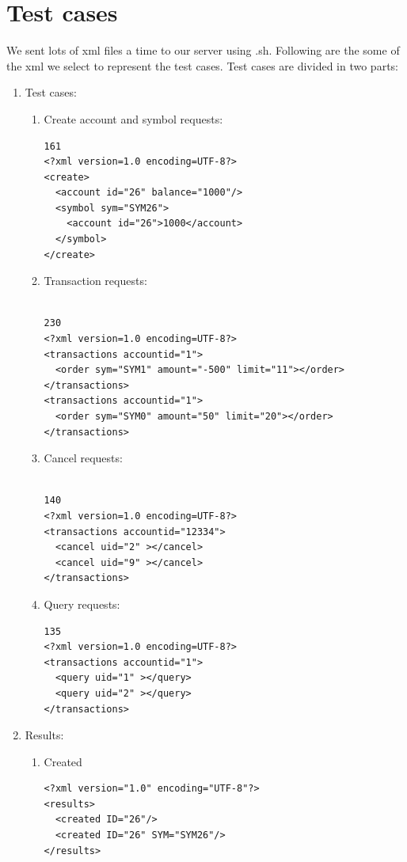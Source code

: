\documentclass{article}
\begin{document}
\section{Test cases} 
We sent lots of xml files a time to our server using .sh. Following are the some of the xml we select to represent the test cases. Test cases are divided in two parts:
\begin{enumerate}
 \item Test cases:
   \begin{enumerate}
   \item Create account  and symbol requests:  
      \begin{lstlisting}
161                                                                     <?xml version=1.0 encoding=UTF-8?>
<create>
  <account id="26" balance="1000"/>
  <symbol sym="SYM26">
    <account id="26">1000</account>
  </symbol>
</create>

      \end{lstlisting}
      \item Transaction requests:  
      \begin{lstlisting}

230                                                                     <?xml version=1.0 encoding=UTF-8?>
<transactions accountid="1">
  <order sym="SYM1" amount="-500" limit="11"></order>
</transactions>
<transactions accountid="1">
  <order sym="SYM0" amount="50" limit="20"></order>
</transactions>

      \end{lstlisting}
      
       \item Cancel requests:  
      \begin{lstlisting}

140
<?xml version=1.0 encoding=UTF-8?>
<transactions accountid="12334">
  <cancel uid="2" ></cancel>
  <cancel uid="9" ></cancel>
</transactions>
      \end{lstlisting}
      
      \item Query requests:  
      \begin{lstlisting}
135                                                                     <?xml version=1.0 encoding=UTF-8?>
<transactions accountid="1">
  <query uid="1" ></query>
  <query uid="2" ></query>
</transactions>
      \end{lstlisting}
   \end{enumerate}
 \item Results:
     \begin{enumerate}
     \item Created
     \begin{lstlisting}
<?xml version="1.0" encoding="UTF-8"?>
<results>
  <created ID="26"/>
  <created ID="26" SYM="SYM26"/>
</results>
     \end{lstlisting}
      

\end{enumerate}
\end{enumerate}
\end{document}
